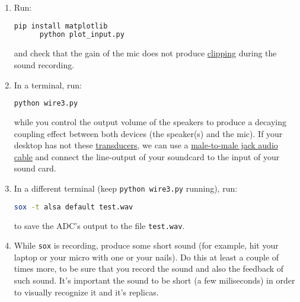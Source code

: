 \begin{enumerate}
\begin{enumerate}
  \begin{lstlisting}[language=Bash]
    sudo apt install sox
    sudo apt install audacity
    sudo apt install curl
    curl https://raw.githubusercontent.com/Tecnologias-multimedia/intercom/master/test/sounddevice/plot_input.py > plot_input.py
  \end{lstlisting}

  \item Run:
    
    \begin{lstlisting}[language=Bash]
      pip install matplotlib
      python plot_input.py
    \end{lstlisting}

    and check that the gain of the mic does not
    produce \href{https://en.wikipedia.org/wiki/Clipping_(audio)}{clipping}
    during the sound recording.

  \item \label{start_point} In a terminal, run:

    \begin{lstlisting}[language=Bash]
      python wire3.py
    \end{lstlisting}

    while you control the output volume of the speakers to produce a
    decaying coupling effect between both devices (the speaker(s) and
    the mic). If your desktop has not these
    \href{https://en.wikipedia.org/wiki/Transducer}{transducers}, we
    can use a
    \href{https://www.google.com/search?q=male+to+male+audio+jack+cable&client=firefox-b-d&sxsrf=ALeKk00GZUDGqiOfc0D8xkA_MIYgCuZmSA:1600270049146&source=lnms&tbm=isch&sa=X&ved=2ahUKEwjdvsu-_u3rAhXl0eAKHS90DUoQ_AUoAXoECA0QAw&biw=4288&bih=972}{male-to-male
      jack audio cable} and connect the line-output of your soundcard
    to the input of your sound card.

  \item In a different terminal (keep \texttt{python wire3.py}
    running), run:

    \begin{lstlisting}[language=Bash]
      sox -t alsa default test.wav
    \end{lstlisting}

    to save the ADC's output to the file \texttt{test.wav}.

  \item While \texttt{sox} is recording, produce some short sound (for
    example, hit your laptop or your micro with one or your nails). Do
    this at least a couple of times more, to be sure that you record
    the sound and also the feedback of such sound. It's important the
    sound to be short (a few miliseconds) in order to visually
    recognize it and it's replicas.


\end{enumerate}
\end{enumerate}
